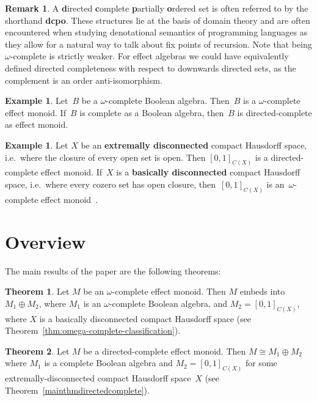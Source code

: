 \documentclass[10pt,conference]{IEEEtran}
\newcommand\Define[1]{\textbf{#1}}
\newcounter{counter}
\theoremstyle{definition}
\newtheorem*{theorem*}{Theorem}
\newtheorem{example}[counter]{Example}
\newtheorem{remark}[counter]{Remark}
\begin{document}
\begin{remark}
    A \textbf{d}irected \textbf{c}omplete \textbf{p}artially \textbf{o}rdered set is often referred to by the shorthand \Define{dcpo}. These structures lie at the basis of domain theory and are often encountered when studying denotational semantics of programming languages as they allow for a natural way to talk about fix points of recursion. Note that being $\omega$-complete is strictly weaker. For effect algebras we could have equivalently defined directed completeness with respect to downwards directed sets, as the complement is an order anti-isomorphism.
\end{remark}

\begin{example}
    Let~$B$ be a $\omega$-complete Boolean algebra. 
    Then~$B$ is a $\omega$-complete effect monoid.
    If~$B$ is complete as a Boolean algebra, then~$B$
        is directed-complete as effect monoid.
\end{example}

\begin{example}
    Let $X$ be an \Define{extremally disconnected} compact Hausdorff
    space, i.e.~where the closure of every open set is  open.
    Then $[0,1]_{C(X)}$ is a directed-complete effect monoid.
    If~$X$ is a \Define{basically disconnected} \cite[1H]{gillman2013rings}
    compact Hausdorff
        space, i.e.~where every cozero set has open closure,
        then~$[0,1]_{C(X)}$ is an~$\omega$-complete effect
            monoid~\cite[3N.5]{gillman2013rings}.
\end{example}

\section{Overview}
The main results of the paper are the following theorems:

\begin{theorem*}
    Let $M$ be an $\omega$-complete effect monoid.
    Then $M$ embeds into $M_1\oplus M_2$, where
    $M_1$ is an $\omega$-complete Boolean algebra,
    and $M_2 =[0,1]_{C(X)}$, 
    where $X$ is a basically disconnected compact Hausdorff space 
    (see Theorem~\ref{thm:omega-complete-classification}).
\end{theorem*}

\begin{theorem*}
    Let $M$ be a directed-complete effect monoid.
    Then $M \cong M_1 \oplus M_2$ where $M_1$ is a
    complete Boolean algebra and $M_2=[0,1]_{C(X)}$ for some
    extremally-disconnected compact Hausdorff space~$X$
    (see Theorem~\ref{mainthmdirectedcomplete}).
\end{theorem*}
\end{document}
